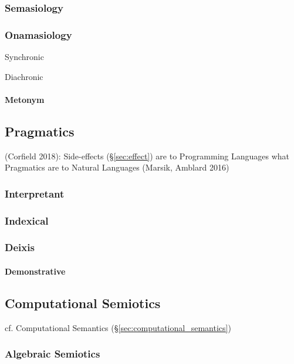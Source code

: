 \subsubsection{Semasiology}\label{sec:semasiology}

\subsubsection{Onamasiology}\label{sec:onamasiology}

Synchronic

Diachronic

\paragraph{Metonym}\label{sec:metonym}\hfill



\subsection{Pragmatics}\label{sec:pragmatics}

(Corfield 2018): Side-effects (\S\ref{sec:effect}) are to Programming Languages
what Pragmatics are to Natural Languages (Marsik, Amblard 2016)



\subsubsection{Interpretant}\label{sec:interpretant}

\subsubsection{Indexical}\label{sec:indexical}

\subsubsection{Deixis}\label{sec:deixis}

\paragraph{Demonstrative}\label{sec:demonstrative}\hfill



\subsection{Computational Semiotics}\label{sec:computational_semiotics}

cf. Computational Semantics (\S\ref{sec:computational_semantics})



\subsubsection{Algebraic Semiotics}\label{sec:algebraic_semiotics}
